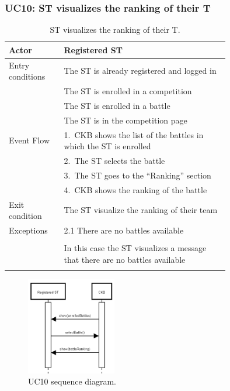 \subsubsection*{UC10: ST visualizes the ranking of their T}
\begin{center}
  \begin{longtable}{l|p{0.75\linewidth}}
    \hline
    Actor & Registered ST \\
    \hline
    Entry conditions & The ST is already registered and logged in \\
    & The ST is enrolled in a competition \\
    & The ST is enrolled in a battle \\
    & The ST is in the competition page \\
    \hline
    Event Flow & 1.\ CKB shows the list of the battles in which the ST is enrolled \\
    & 2.\ The ST selects the battle \\
    & 3.\ The ST goes to the “Ranking” section \\
    & 4.\ CKB shows the ranking of the battle \\
    \hline
    Exit condition &  The ST visualize the ranking of their team \\
    \hline
    Exceptions & 2.1 There are no battles available \\ \\
    & In this case the ST visualizes a message that there are no battles available \\
    \hline
    \caption{ST visualizes the ranking of their T.}
    \label{tab: ST_visualize_ranking}
  \end{longtable}

  \begin{figure} [H]
    \begin{center}
        \includegraphics[width=0.35\textwidth,height=\textheight,keepaspectratio]{Images/SequenceDiagrams/UC10.png}
        \caption{UC10 sequence diagram.}
        \label{fig: UC10_sequence_diagram}
    \end{center}
  \end{figure}
\end{center}


